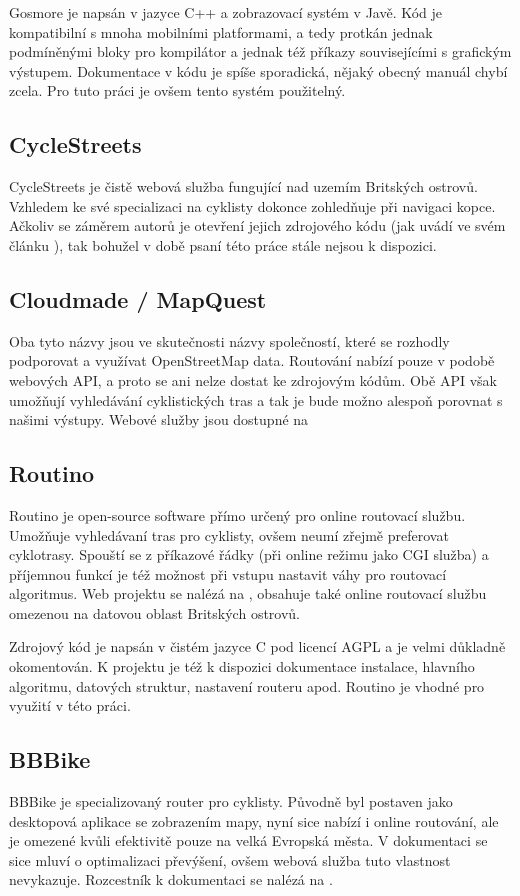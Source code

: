 \documentclass[thesis=B,czech]{FITthesis}[2012/06/26]
\begin{document}
Gosmore \cite{gosmore} je napsán v jazyce C++ a zobrazovací systém v Javě. Kód je kompatibilní s mnoha mobilními platformami, a tedy protkán jednak podmíněnými bloky pro kompilátor a jednak též příkazy souvisejícími s grafickým výstupem. Dokumentace v kódu je spíše sporadická, nějaký obecný manuál chybí zcela. Pro tuto práci je ovšem tento systém použitelný.

\subsection{CycleStreets}
CycleStreets \cite{cyclestreets} je čistě webová služba fungující nad uzemím Britských ostrovů. Vzhledem ke své specializaci na cyklisty dokonce zohledňuje při navigaci kopce. Ačkoliv se záměrem autorů je otevření jejich zdrojového kódu (jak uvádí ve svém článku \cite{cyclestreets-article}), tak bohužel v době psaní této práce stále nejsou k dispozici. 

\subsection{Cloudmade / MapQuest}
Oba tyto názvy jsou ve skutečnosti názvy společností, které se rozhodly podporovat a využívat OpenStreetMap data. Routování nabízí pouze v podobě webových API, a proto se ani nelze dostat ke zdrojovým kódům. Obě API však umožňují vyhledávání cyklistických tras a tak je bude možno alespoň porovnat s našimi výstupy. Webové služby jsou dostupné na \cite{cloudmade,mapquest}


\subsection{Routino}
Routino je open-source software přímo určený pro online routovací službu. Umožňuje vyhledávaní tras pro cyklisty, ovšem neumí zřejmě preferovat cyklotrasy. Spouští se z příkazové řádky (při online režimu jako CGI služba) a příjemnou funkcí je též možnost při vstupu nastavit váhy pro routovací algoritmus. Web projektu se nalézá na \cite{routino}, obsahuje také online routovací službu omezenou na datovou oblast Britských ostrovů.

Zdrojový kód je napsán v čistém jazyce C pod licencí AGPL a je velmi důkladně okomentován. K projektu je též k dispozici dokumentace instalace, hlavního algoritmu, datových struktur, nastavení routeru apod. Routino je vhodné pro využití v této práci.

\subsection{BBBike}
BBBike je specializovaný router pro cyklisty. Původně byl postaven jako desktopová aplikace se zobrazením mapy, nyní sice nabízí i online routování, ale je omezené kvůli efektivitě pouze na velká Evropská města. V dokumentaci se sice mluví o optimalizaci převýšení, ovšem webová služba tuto vlastnost nevykazuje. Rozcestník k dokumentaci se nalézá na \cite{bbbike}.
\end{document}
